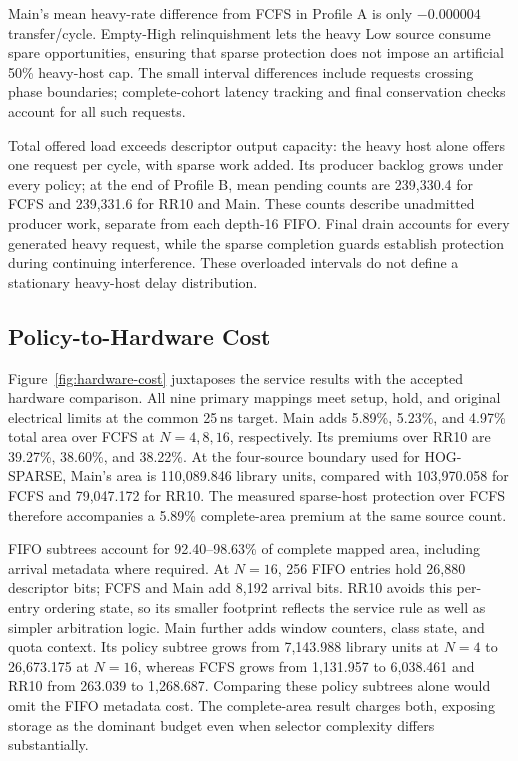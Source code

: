 Main's mean heavy-rate difference from FCFS in Profile A is only $-0.000004$
transfer/cycle. Empty-High relinquishment lets the heavy Low source consume
spare opportunities, ensuring that sparse protection does not impose an artificial 50\% heavy-host
cap. The small interval differences include requests crossing phase boundaries;
complete-cohort latency tracking and final conservation checks account for all such requests.

Total offered load exceeds descriptor output capacity: the heavy host alone
offers one request per cycle, with sparse work added. Its producer backlog
grows under every policy; at the end of Profile B,
mean pending counts are 239,330.4 for FCFS and 239,331.6 for RR10 and Main.
These counts describe unadmitted producer work, separate from each depth-16
FIFO. Final drain accounts for every generated heavy request, while the sparse
completion guards establish protection during continuing interference. These
overloaded intervals do not define a stationary heavy-host delay distribution.

\subsection{Policy-to-Hardware Cost}
Figure~\ref{fig:hardware-cost} juxtaposes the service results with the accepted
hardware comparison. All nine primary mappings meet setup, hold, and original
electrical limits at the common 25\,ns target. Main adds 5.89\%, 5.23\%, and
4.97\% total area over FCFS at $N=4,8,16$, respectively. Its premiums over
RR10 are 39.27\%, 38.60\%, and 38.22\%. At the four-source boundary used
for HOG-SPARSE, Main's area is 110,089.846 library units, compared with
103,970.058 for FCFS and 79,047.172 for RR10. The measured sparse-host
protection over FCFS therefore accompanies a 5.89\% complete-area premium
at the same source count.



FIFO subtrees account for 92.40--98.63\% of complete mapped area, including
arrival metadata where required. At $N=16$, 256 FIFO entries hold 26,880
descriptor bits; FCFS and Main add 8,192 arrival bits. RR10 avoids this
per-entry ordering state, so its smaller footprint reflects the service rule
as well as simpler arbitration logic. Main further
adds window counters, class state, and quota context. Its policy subtree
grows from 7,143.988 library units at $N=4$ to 26,673.175 at $N=16$,
whereas FCFS grows from 1,131.957 to 6,038.461 and RR10 from 263.039
to 1,268.687. Comparing these policy subtrees alone would omit the FIFO
metadata cost. The complete-area result charges both, exposing storage as
the dominant budget even when selector complexity differs substantially.

